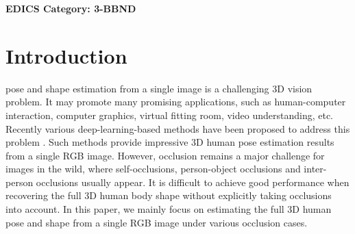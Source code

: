 \documentclass[journal]{IEEEtran}
\begin{document}
\ifCLASSOPTIONpeerreview
\begin{center} \bfseries EDICS Category: 3-BBND \end{center}
\fi
%
\IEEEpeerreviewmaketitle



\section{Introduction}
% 
% 
% 
% 

 

 pose and shape estimation from a single image is a challenging 3D vision problem. It may promote many promising applications, such as human-computer interaction, computer graphics, virtual fitting room, video understanding, etc. Recently   various deep-learning-based methods have been proposed to address this problem \cite{SMPL-X:2019,kolotouros2019spin,zanfir2018monocular,tan2017indirect,pavlakos2018learning}. Such methods provide impressive 3D human pose estimation results from a single RGB image. However, occlusion remains a major challenge for images in the wild, where self-occlusions, person-object occlusions and inter-person occlusions usually appear. It is difficult to achieve good performance when recovering the full 3D human body shape without explicitly taking occlusions into account. In this paper, we mainly focus on estimating the full 3D human pose and shape from a single RGB image under various occlusion cases.
\end{document}
